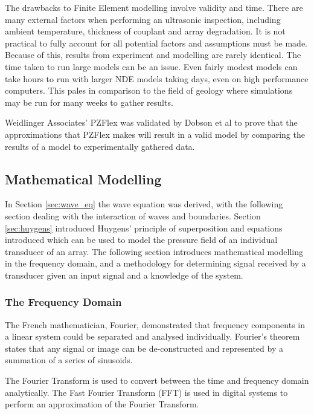 The drawbacks to Finite Element modelling involve validity and time. There are many external factors when performing an ultrasonic inspection, including ambient temperature, thickness of couplant and array degradation. It is not practical to fully account for all potential factors and assumptions must be made. Because of this, results from experiment and modelling are rarely identical. The time taken to run large models can be an issue. Even fairly modest models can take hours to run with larger NDE models taking days, even on high performance computers. This pales in comparison to the field of geology where simulations may be run for many weeks to gather results.

Weidlinger Associates' PZFlex\cite{flex_web} was validated by Dobson et al to prove that the approximations that PZFlex makes will result in a valid model by comparing the results of a model to experimentally gathered data\cite{dobson_finite_2016}.


\subsection{Mathematical Modelling}

In Section \ref{sec:wave_eq} the wave equation was derived, with the following section dealing with the interaction of waves and boundaries. Section \ref{sec:huygens} introduced Huygens' principle of superposition and equations introduced which can be used to model the pressure field of an individual transducer of an array. The following section introduces mathematical modelling in the frequency domain, and a methodology for determining signal received by a transducer given an input signal and a knowledge of the system.

\subsubsection{The Frequency Domain}

The French mathematician, Fourier, demonstrated that frequency components in a linear system could be separated and analysed individually\cite{bracewell_fourier_2000}. Fourier's theorem states that any signal or image can be de-constructed and represented by a summation of a series of sinusoids\cite{szilard_ultrasonic_1982}.

The Fourier Transform is used to convert between the time and frequency domain analytically. The Fast Fourier Transform (FFT) is used in digital systems to perform an approximation of the Fourier Transform.

